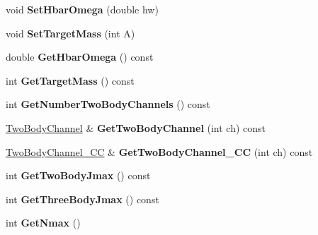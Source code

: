 \begin{DoxyCompactItemize}
\item 
\hypertarget{classModelSpace_abc4f6a563b71977d1e0a99eb5367a2d7}{void {\bfseries Set\-Hbar\-Omega} (double hw)}\label{classModelSpace_abc4f6a563b71977d1e0a99eb5367a2d7}

\item 
\hypertarget{classModelSpace_ab29013a1b7b4b8b26d5905f97c135931}{void {\bfseries Set\-Target\-Mass} (int A)}\label{classModelSpace_ab29013a1b7b4b8b26d5905f97c135931}

\item 
\hypertarget{classModelSpace_a4cf15b20d8262cdab4ab1cadd412de7f}{double {\bfseries Get\-Hbar\-Omega} () const }\label{classModelSpace_a4cf15b20d8262cdab4ab1cadd412de7f}

\item 
\hypertarget{classModelSpace_a2f6a8428767c064a63796d4fc010e41e}{int {\bfseries Get\-Target\-Mass} () const }\label{classModelSpace_a2f6a8428767c064a63796d4fc010e41e}

\item 
\hypertarget{classModelSpace_a7c0b9152d68e069f9774078bd2a429b7}{int {\bfseries Get\-Number\-Two\-Body\-Channels} () const }\label{classModelSpace_a7c0b9152d68e069f9774078bd2a429b7}

\item 
\hypertarget{classModelSpace_ab2c315fd347fe93dd63246dea3d02f35}{\hyperlink{classTwoBodyChannel}{Two\-Body\-Channel} \& {\bfseries Get\-Two\-Body\-Channel} (int ch) const }\label{classModelSpace_ab2c315fd347fe93dd63246dea3d02f35}

\item 
\hypertarget{classModelSpace_a6709279838180ef0a6745320c9ad6926}{\hyperlink{classTwoBodyChannel__CC}{Two\-Body\-Channel\-\_\-\-C\-C} \& {\bfseries Get\-Two\-Body\-Channel\-\_\-\-C\-C} (int ch) const }\label{classModelSpace_a6709279838180ef0a6745320c9ad6926}

\item 
\hypertarget{classModelSpace_a3cbf323130388fae05fed1b59c5bac90}{int {\bfseries Get\-Two\-Body\-Jmax} () const }\label{classModelSpace_a3cbf323130388fae05fed1b59c5bac90}

\item 
\hypertarget{classModelSpace_a23ec9e8797755abfc0986b2e2c73a056}{int {\bfseries Get\-Three\-Body\-Jmax} () const }\label{classModelSpace_a23ec9e8797755abfc0986b2e2c73a056}

\item 
\hypertarget{classModelSpace_aa17b852a2902e4ec22a5c87f53de2dea}{int {\bfseries Get\-Nmax} ()}\label{classModelSpace_aa17b852a2902e4ec22a5c87f53de2dea}


\end{DoxyCompactItemize}
